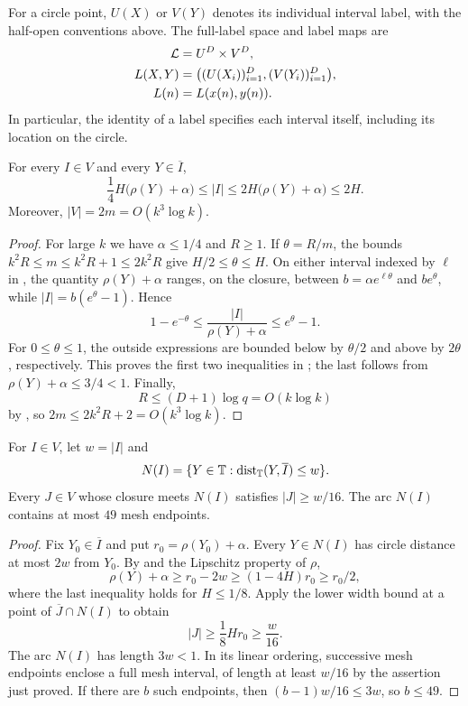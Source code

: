 For a circle point, $U(X)$ or $V(Y)$ denotes its individual interval
label, with the half-open conventions above. The full-label space and
label maps are
\begin{equation}\label{setup:labels}
 \begin{split}
 \mathcal L&=U^D\times V^D,\\
 L(X,Y)&=\bigl((U(X_i))_{i=1}^D,(V(Y_i))_{i=1}^D\bigr),\\
 L(n)&=L(x(n),y(n)).
 \end{split}
\end{equation}
In particular, the identity of a label specifies each interval itself,
including its location on the circle.

\begin{lemma}\label{mesh:width}
For every $I\in V$ and every $Y\in\overline I$,
\begin{equation}\label{mesh:width-bounds}
 \frac14H\bigl(\rho(Y)+\alpha\bigr)
 \le |I|\le2H\bigl(\rho(Y)+\alpha\bigr)\le2H.
\end{equation}
Moreover, $|V|=2m=O(k^3\log k)$.
\end{lemma}

\begin{proof}
For large $k$ we have $\alpha\le1/4$ and $R\ge1$. If
$\theta=R/m$, the bounds $k^2R\le m\le k^2R+1\le2k^2R$ give
$H/2\le\theta\le H$. On either interval indexed by $\ell$ in
, the quantity $\rho(Y)+\alpha$ ranges, on the
closure, between $b=\alpha e^{\ell\theta}$ and $be^\theta$, while
$|I|=b(e^\theta-1)$. Hence
\[
 1-e^{-\theta}\le\frac{|I|}{\rho(Y)+\alpha}\le e^\theta-1.
\]
For $0\le\theta\le1$, the outside expressions are bounded below by
$\theta/2$ and above by $2\theta$, respectively. This proves the
first two inequalities in ; the last follows
from $\rho(Y)+\alpha\le3/4<1$.
Finally,
\[
 R\le(D+1)\log q=O(k\log k)
\]
by , so $2m\le2k^2R+2=O(k^3\log k)$.
\end{proof}

\begin{lemma}\label{mesh:neighbors}
For $I\in V$, let $w=|I|$ and
\[
 N(I)=\{Y\in\mathbb T:\operatorname{dist}_{\mathbb T}(Y,\overline I)\le w\}.
\]
Every $J\in V$ whose closure meets $N(I)$ satisfies $|J|\ge w/16$.
The arc $N(I)$ contains at most $49$ mesh endpoints.
\end{lemma}

\begin{proof}
Fix $Y_0\in\overline I$ and put $r_0=\rho(Y_0)+\alpha$.
Every $Y\in N(I)$ has circle distance at most $2w$ from $Y_0$.
By  and the Lipschitz property of $\rho$,
\[
 \rho(Y)+\alpha\ge r_0-2w\ge(1-4H)r_0\ge r_0/2,
\]
where the last inequality holds for $H\le1/8$. Apply the lower width
bound at a point of $\overline J\cap N(I)$ to obtain
\[
 |J|\ge\frac18Hr_0\ge\frac{w}{16}.
\]
The arc $N(I)$ has length $3w<1$. In its linear ordering, successive
mesh endpoints enclose a full mesh interval, of length at least
$w/16$ by the assertion just proved. If there are $b$ such endpoints,
then $(b-1)w/16\le3w$, so $b\le49$.
\end{proof}

